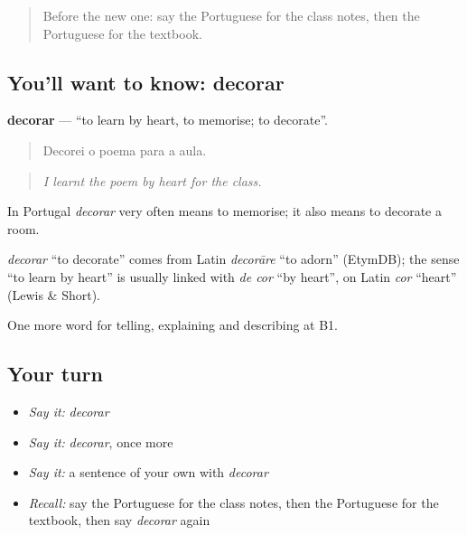 \begin{quote}
Before the new one: say the Portuguese for the class notes, then the Portuguese for the textbook.
\end{quote}

\subsection*{You'll want to know: decorar}
\textbf{decorar} — \textquotedblleft{}to learn by heart, to memorise; to decorate\textquotedblright{}.

\begin{quote}
Decorei o poema para a aula.
\end{quote}

\begin{quote}
\emph{I learnt the poem by heart for the class.}
\end{quote}

In Portugal \emph{decorar} very often means to memorise; it also means to decorate a room.

\begin{cousinweb}
\emph{decorar} \textquotedblleft{}to decorate\textquotedblright{} comes from Latin \emph{decorāre} \textquotedblleft{}to adorn\textquotedblright{} (EtymDB); the sense \textquotedblleft{}to learn by heart\textquotedblright{} is usually linked with \emph{de cor} \textquotedblleft{}by heart\textquotedblright{}, on Latin \emph{cor} \textquotedblleft{}heart\textquotedblright{} (Lewis \& Short).
\end{cousinweb}

\begin{grammarlens}[title={What you've built}]
One more word for telling, explaining and describing at B1.
\end{grammarlens}

\subsection*{Your turn}
\begin{itemize}
\raggedright
  \item \emph{Say it:} \emph{decorar}
  \item \emph{Say it:} \emph{decorar}, once more
  \item \emph{Say it:} a sentence of your own with \emph{decorar}
  \item \emph{Recall:} say the Portuguese for the class notes, then the Portuguese for the textbook, then say \emph{decorar} again
\end{itemize}

